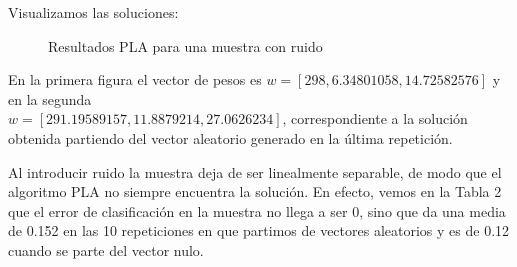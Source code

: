 \documentclass[a4]{article}
\begin{document}
Visualizamos las soluciones:

\begin{figure}[H]
	\centering    
	\caption{Resultados PLA para una muestra con ruido}
	\label{fig:PLA2}
\end{figure}

En la primera figura el vector de pesos es $ w=[298, 6.34801058, 14.72582576] $ y en la segunda\\ $w=[291.19589157,  11.8879214,   27.0626234 ]$, correspondiente a la solución obtenida partiendo del vector aleatorio generado en la última repetición. 

Al introducir ruido la muestra deja de ser linealmente separable, de modo que el algoritmo PLA no siempre encuentra la solución. En efecto, vemos en la Tabla 2 que el error de clasificación en la muestra no llega a ser 0, sino que da una media de 0.152 en las 10 repeticiones en que partimos de vectores aleatorios y es de 0.12 cuando se parte del vector nulo. 
\end{document}
